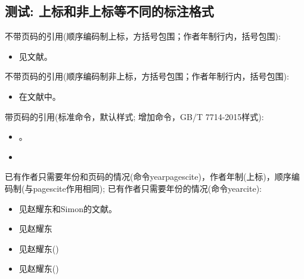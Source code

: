\subsection{测试: 上标和非上标等不同的标注格式}\label{sec:cite:cmd:test}
\begin{refsection}
不带页码的引用(顺序编码制上标，方括号包围；作者年制行内，括号包围):
\begin{itemize}
  \item 见文献\cite{Peebles2001-100-100}。
\end{itemize}

不带页码的引用(顺序编码制非上标，方括号包围；作者年制行内，括号包围):
\begin{itemize}
  \item 在文献\parencite{Miroslav2004--}中。
\end{itemize}

带页码的引用(标准命令，默认样式; 增加命令，GB/T 7714-2015样式):
\begin{itemize}
  \item \cite[见][49页]{蔡敏2006--}\parencite[见][49页]{Miroslav2004--}。
  \item {}
\end{itemize}

已有作者只需要年份和页码的情况(命令yearpagescite)，作者年制(上标)，顺序编码制(与pagescite作用相同);
已有作者只需要年份的情况(命令yearcite):
\begin{itemize}
  \item 见赵耀东和Simon的文献。
  \item 见赵耀东
  \item 见赵耀东(\cite*{赵耀东1998--})
  \item 见赵耀东(\citeyear{赵耀东1998--})
\end{itemize}

\printbibliography[heading=subbibliography,title=【gb7714-2015顺序编码制上标和非上标标注测试】]
\end{refsection}

